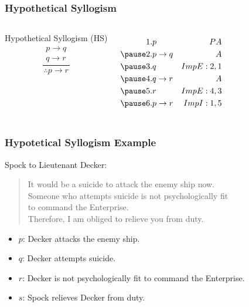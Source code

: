 \documentclass[dvipsnames]{beamer}
\begin{document}
\begin{frame}
  \frametitle{Hypothetical Syllogism}

  \begin{columns}
    \begin{block}{Hypothetical Syllogism (HS)}
      \[
      \frac
        {
          \begin{array}{c}
            p \rightarrow q\\
            q \rightarrow r
          \end{array}}
        {
          \therefore p \rightarrow r
        }
      \]
    \end{block}

    \pause
    \begin{eqnarray*}
      1. & p               & PA\\
      \pause
      2. & p \rightarrow q & A\\
      \pause
      3. & q               & ImpE:2,1\\
      \pause
      4. & q \rightarrow r & A\\
      \pause
      5. & r               & ImpE:4,3\\
      \pause
      6. & p \rightarrow r & ImpI:1,5\\
    \end{eqnarray*}
  \end{columns}
\end{frame}

\begin{frame}
  \frametitle{Hypotetical Syllogism Example}

  Spock to Lieutenant Decker:
  \begin{quote}
    It would be a suicide to attack the enemy ship now.\\
    Someone who attempts suicide is not psychologically fit\\
    to command the Enterprise.\\
    Therefore, I am obliged to relieve you from duty.
  \end{quote}

  \pause
  \begin{itemize}
    \item $p$: Decker attacks the enemy ship.
    \item $q$: Decker attempts suicide.
    \item $r$: Decker is not psychologically fit to command the Enterprise.
    \item $s$: Spock relieves Decker from duty.
  \end{itemize}
\end{frame}
\end{document}
